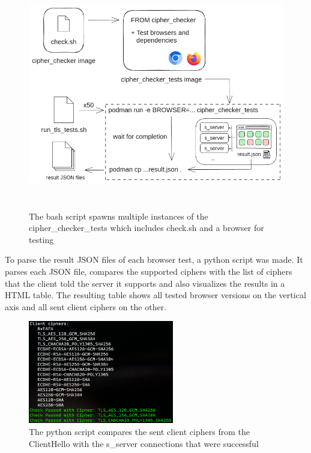 \documentclass[12pt]{scrbook}
\begin{document}
\begin{figure}[!h]
	\centering
	\includegraphics[height=10cm]{./images/cipher_checker_tests.png}
	\caption{The bash script spawns multiple instances of the
		cipher\_checker\_tests which includes check.sh and a browser for testing}
\end{figure}

To parse the result JSON files of each browser test, a python script was made.
It parses each JSON file, compares the supported ciphers
with the list of ciphers that the client told the server it supports and also
visualizes the results in a HTML table.
The resulting table shows all tested browser versions on the vertical axis and
all sent client ciphers on the other.

\begin{figure}[!hb]
	\centering
	\includegraphics[height=45mm]{./images/parse_results.png}
	\caption{The python script compares the sent client ciphers from the
		ClientHello with the s\_server connections that were successful}
\end{figure}
\end{document}
